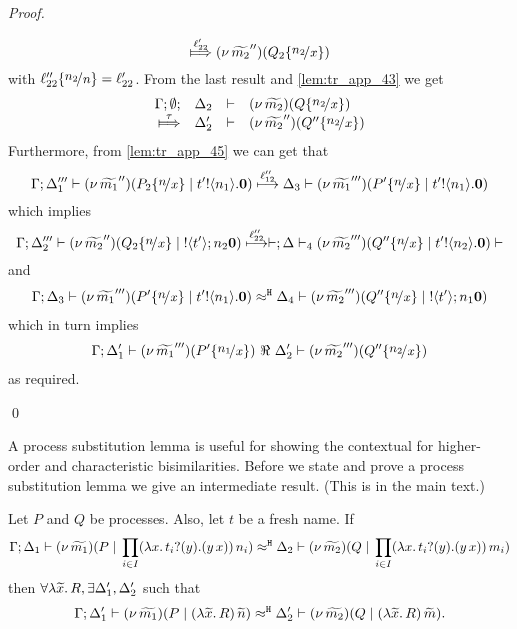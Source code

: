 \begin{proof}
\begin{enumerate}[1.]
\begin{itemize}
\begin{itemize}
\[											\Hby{ \ell_{22}' }
											\newsp{\widetilde{m_2}''}{Q_2 \subst{n_2}{x}}
										\]
										with $\ell_{22}'' \subst{n_2}{n} = \ell_{22}'$.
										From the last result and \eqref{lem:tr_app_43} we get
										\[
											\mhorel{\Gamma}{\Delta_2}{\newsp{\widetilde{m_2}}{ Q \subst{n_2}{x}   }  }
											{\Hby{\tau}}
											{\Delta_2'}{}{\newsp{\widetilde{m_2}''}{ Q'' \subst{n_2}{x}   }  }
										\]
										Furthermore, from \eqref{lem:tr_app_45} we can get that
										\[
											\horel{\Gamma}{\Delta_1'''}{\newsp{\widetilde{m_1}''}{P_2 \subst{n}{x} \Par \bout{t'}{n_1} \inact}}
											{\hby{\ell_{12}''}}
											{\Delta_3}{\newsp{\widetilde{m_1}'''}{P' \subst{n}{x} \Par \bout{t'}{n_1} \inact}}
										\]
										which implies
										\[
											\horel{\Gamma}{\Delta_2'''}{\newsp{\widetilde{m_2}''}{Q_2 \subst{n}{x} \Par \btout{t'}{n_2} \inact}}
											{\hby{\ell_{22}''}}
											\horel{\Delta_4}{\newsp{\widetilde{m_2}'''}{Q'' \subst{n}{x} \Par \bout{t'}{n_2} \inact}}
										\]
										and
										\begin{eqnarray*}
											\horel{\Gamma}{\Delta_3}{\newsp{\widetilde{m_1}'''}{P' \subst{n}{x} \Par \bout{t'}{n_1} \inact}}
											{\hwb}
											{\Delta_4}{\newsp{\widetilde{m_2}'''}{Q'' \subst{n}{x} \Par \btout{t'}{n_1} \inact}}
										\end{eqnarray*}
										which in turn implies
										\begin{eqnarray*}
											\horel{\Gamma}{\Delta_1'}{\newsp{\widetilde{m_1}'''}{P' \subst{n_1}{x}}}
											{\ \Re\ }
											{\Delta_2'}{\newsp{\widetilde{m_2}'''}{Q'' \subst{n_2}{x}}}
										\end{eqnarray*}
										as required.
							\end{itemize}
					\end{itemize}
	\end{enumerate}
	\qed
\end{proof}

A process substitution lemma is useful for showing the
contextual for higher-order and characteristic bisimilarities.
Before we state and prove a process substitution lemma
we give an intermediate result.
(This is  in the main text.)

\begin{lemma}
	\label{lem:trigger_subst}
	Let $P$ and $Q$ be processes. Also, let $t$ be a fresh name. If
	\[
		\Gamma; \Delta_1 \vdash (\nu\, \widetilde{m_1})(P \;|\; \prod_{i \in I} (\lambda x.\,t_i ? (y) . (y\, {x}))\, {n_i} ) \approx^\mathtt{H} \Delta_2 \vdash (\nu\, \widetilde{m_2})(Q \;|\;\prod_{i \in I} (\lambda x.\,t_i ? (y) . (y\, {x}))\, {m_i} )
	\]
	then $\forall \lambda \widetilde{x}.\,R, \exists \Delta_1', \Delta_2'$ such that
	\[
		\Gamma; \Delta_1' \vdash (\nu\, \widetilde{m_1})(P \;|\; (\lambda \widetilde{x}.\,R)\, {\widetilde{n}} ) \approx^\mathtt{H} \Delta_2' \vdash (\nu\, \widetilde{m_2})(Q \;|\; (\lambda \widetilde{x}.\,R)\, {\widetilde{m}} ).
	\]
\end{lemma}

